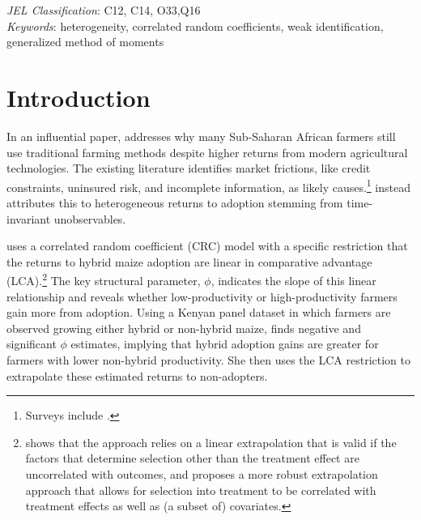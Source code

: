\documentclass[12pt]{article}
\theoremstyle{plain}
\theoremstyle{definition}
\begin{document}
\begin{titlepage}
	{\small \noindent\emph{JEL Classification}: C12, C14, O33,Q16
		\\
	\emph{Keywords}: heterogeneity, correlated random coefficients, weak identification, generalized method of moments}
\end{titlepage}

\onehalfspacing
\section{Introduction}
    
In an influential paper, \citet{S2011} addresses why many Sub-Saharan African farmers still use traditional farming methods despite higher returns from modern agricultural technologies.
The existing literature identifies market frictions, like credit constraints, uninsured risk, and incomplete information, as likely causes.\footnote{Surveys include \citet{federetal1985, foster2010, jack2013market, magruder2018assessment}.}
\citet{S2011} instead attributes this to heterogeneous returns to adoption stemming from time-invariant unobservables.

\citet{S2011} uses a correlated random coefficient (CRC) model with a specific restriction that the returns to hybrid maize adoption are linear in comparative advantage (LCA).\footnote{\citet{V2020} shows that the \citet{S2011} approach relies on a linear extrapolation that is valid if the factors that determine selection other than the treatment effect are uncorrelated with outcomes, and proposes a more robust extrapolation approach that allows for selection into treatment to be correlated with treatment effects as well as (a subset of) covariates.}  
The key structural parameter, $\phi$, indicates the slope of this linear relationship and reveals whether low-productivity or high-productivity farmers gain more from adoption.
Using a Kenyan panel dataset in which farmers are observed growing either hybrid or non-hybrid maize, \citet{S2011} finds negative and significant $\phi$ estimates, implying that hybrid adoption gains are greater for farmers with lower non-hybrid productivity.
She then uses the LCA restriction to extrapolate these estimated returns to non-adopters.
\end{document}
